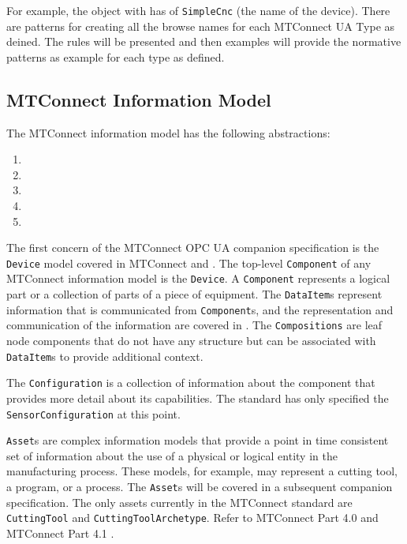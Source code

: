 For example, the object with  has  of \texttt{SimpleCnc} (the name of the device). There are patterns for creating all the browse names for each MTConnect UA Type as deined. The rules will be presented and then examples will provide the normative patterns as example for each type as defined.

\FloatBarrier

\subsection{MTConnect Information Model}

The MTConnect information model has the following abstractions:

\begin{enumerate}
\item {}
\item {}
\item {}
\item {}
\item {}
\end{enumerate}

The first concern of the MTConnect OPC UA companion specification is the \texttt{Device} model covered in MTConnect \cite{MTCPart2} and \cite{MTCPart3}. The top-level \texttt{Comp\-onent} of any MTConnect information model is the \texttt{Device}. A \texttt{Comp\-onent} represents a logical part or a collection of parts of a piece of equipment. The \texttt{Data\-Item}s represent information that is communicated from \texttt{Component}s, and the representation and communication of the information are covered in \cite{MTCPart3}. The \texttt{Compositions} are leaf node components that do not have any structure but can be associated with \texttt{Data\-Item}s to provide additional context. 

The \texttt{Configuration} is a collection of information about the component that provides more detail about its capabilities. The standard has only specified the \texttt{Sensor\-Configuration} at this point.

\texttt{Asset}s are complex information models that provide a point in time consistent set of information about the use of a physical or logical entity in the manufacturing process. These models, for example, may represent a cutting tool, a program, or a process. The \texttt{Asset}s will be covered in a subsequent companion specification. The only assets currently in the MTConnect standard are \texttt{CuttingTool} and \texttt{CuttingToolArchetype}. Refer to MTConnect Part 4.0 \cite{MTCPart40} and MTConnect Part 4.1 \cite{MTCPart41}.

